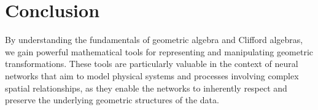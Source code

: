 \documentclass[a4paper,14pt]{article}
\theoremstyle{plain} %
\theoremstyle{definition} %
\theoremstyle{remark} %
\theoremstyle{definition}
\theoremstyle{remark}
\theoremstyle{remark}
\begin{document}
	
	\section{Conclusion}
	
	By understanding the fundamentals of geometric algebra and Clifford algebras, we gain powerful mathematical tools for representing and manipulating geometric transformations. These tools are particularly valuable in the context of neural networks that aim to model physical systems and processes involving complex spatial relationships, as they enable the networks to inherently respect and preserve the underlying geometric structures of the data.
	
	
	
	\nocite{*}
	\printbibliography
	
\end{document}
